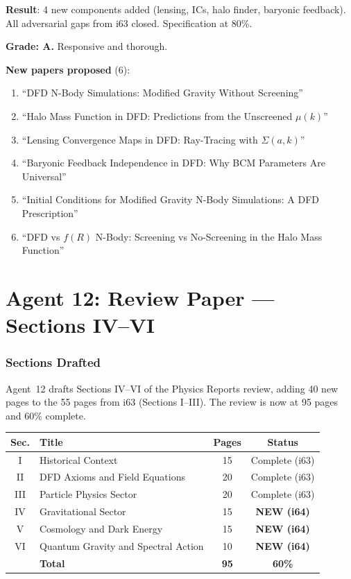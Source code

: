 \documentclass[11pt,a4paper]{article}
\begin{document}
\begin{tcolorbox}[colback=green!5!white, colframe=green!60!black, title={Agent 11: N-Body Specification at 80\%}]
\textbf{Result}: 4 new components added (lensing, ICs, halo finder, baryonic feedback). All adversarial gaps from i63 closed. Specification at 80\%.

\textbf{Grade: A.} Responsive and thorough.

\textbf{New papers proposed} (6):
\begin{enumerate}
\item ``DFD N-Body Simulations: Modified Gravity Without Screening''
\item ``Halo Mass Function in DFD: Predictions from the Unscreened $\mu(k)$''
\item ``Lensing Convergence Maps in DFD: Ray-Tracing with $\Sigma(a,k)$''
\item ``Baryonic Feedback Independence in DFD: Why BCM Parameters Are Universal''
\item ``Initial Conditions for Modified Gravity N-Body Simulations: A DFD Prescription''
\item ``DFD vs $f(R)$ N-Body: Screening vs No-Screening in the Halo Mass Function''
\end{enumerate}
\end{tcolorbox}


\part{Agent 12: Review Paper --- Sections IV--VI}
\label{part:review-iv-vi}

\section{Sections Drafted}

Agent~12 drafts Sections IV--VI of the Physics Reports review, adding 40 new pages to the 55 pages from i63 (Sections I--III). The review is now at 95 pages and 60\% complete.

\begin{center}
\begin{tabular}{clcc}
\toprule
\textbf{Sec.} & \textbf{Title} & \textbf{Pages} & \textbf{Status} \\
\midrule
I & Historical Context & 15 & Complete (i63) \\
II & DFD Axioms and Field Equations & 20 & Complete (i63) \\
III & Particle Physics Sector & 20 & Complete (i63) \\
IV & Gravitational Sector & 15 & \textbf{NEW (i64)} \\
V & Cosmology and Dark Energy & 15 & \textbf{NEW (i64)} \\
VI & Quantum Gravity and Spectral Action & 10 & \textbf{NEW (i64)} \\
\midrule
& \textbf{Total} & \textbf{95} & \textbf{60\%} \\
\bottomrule
\end{tabular}
\end{center}
\end{document}
